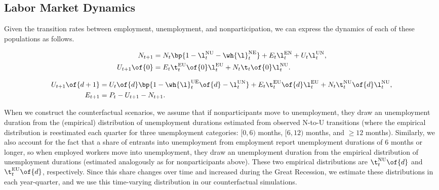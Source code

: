 \documentclass[12pt]{article}
\newcommand{\CiteReference}{../reference.bib}
\theoremstyle{definition}
\begin{document}
\subsection{Labor Market Dynamics}

Given the transition rates between employment, unemployment, and nonparticipation, we can express the dynamics of each of these populations as follows.

\begin{equation}
    \label{3}
    \begin{aligned}
        N_{t+1} & = N_t \bp{1 - \l_t^{\text{NU}} - \wh{\l}_t^{\text{NE}}} + E_t \l_t^{\text{EN}} + U_t \l_t^{\text{UN}}, \\
        U_{t+1}\of{0} &= E_t \t_t^{\text{EU}}\of{0} \l_t^{\text{EU}} + N_t \t_t\of{0}\l_t^{\text{NU}}.
    \end{aligned}
\end{equation}

\begin{equation}
    \label{4}
    \begin{aligned}
        U_{t+1}\of{d+1} & = U_t\of{d}\bp{1 - \wh{\l}_t^{\text{UE}}\of{d} - \l_t^{\text{UN}}} + E_t \t_t^{\text{EU}}\of{d} \l_t^{\text{EU}} + N_t \t_t^{\text{NU}}\of{d} \l_t^{\text{NU}}, \\
        E_{t+1} &= P_t - U_{t+1} - N_{t+1}.
    \end{aligned}
\end{equation}


When we construct the counterfactual scenarios, we assume that if nonparticipants move to unemployment, they draw an unemployment duration from the (empirical) distribution of unemployment durations estimated from observed N-to-U transitions (where the empirical distribution is reestimated each quarter for three unemployment categories: $[0, 6)$ months, $[6, 12)$ months, and $\geq 12$ months). Similarly, we also account for the fact that a share of entrants into unemployment from employment report unemployment durations of 6 months or longer, so when employed workers move into unemployment, they draw an unemployment duration from the empirical distribution of unemployment durations (estimated analogously as for nonparticipants above). These two empirical distributions are $\t_t^{\text{NU}}\of{d}$ and $\t_t^{\text{EU}}\of{d}$, respectively. Since this share changes over time and increased during the Great Recession, we estimate these distributions in each year-quarter, and we use this time-varying distribution in our counterfactual simulations.


 
\end{document}
